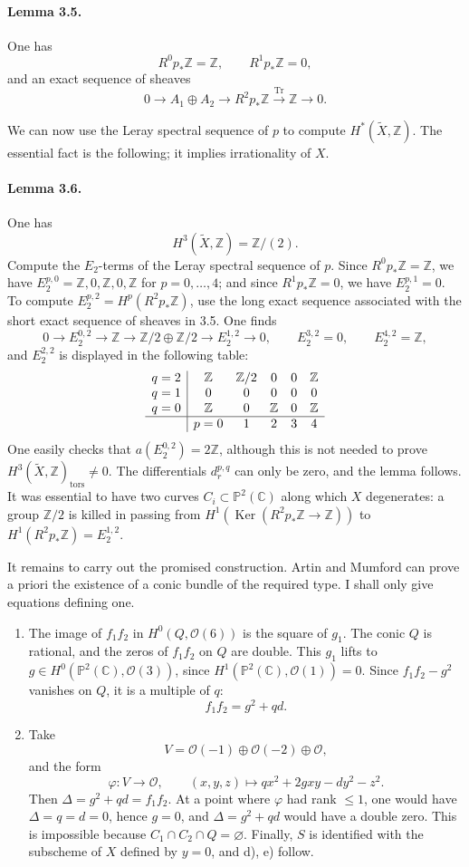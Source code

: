 \documentclass[10pt]{article}
\newcommand{\C}{\mathbb C}
\newcommand{\Pj}{\mathbb P}
\newcommand{\Z}{\mathbb Z}
\newcommand{\Tr}{\operatorname{Tr}}
\newcommand{\Ker}{\operatorname{Ker}}
\newcommand{\tors}{\operatorname{tors}}
\begin{document}
\paragraph{Lemma 3.5.} One has
\[
R^0p_*\Z=\Z,
\qquad R^1p_*\Z=0,
\]
and an exact sequence of sheaves
\[
0\longrightarrow A_1\oplus A_2\longrightarrow R^2p_*\Z\xrightarrow{\Tr}\Z\longrightarrow0.
\]

We can now use the Leray spectral sequence of \(p\) to compute \(H^*(\widetilde X,\Z)\). The essential fact is the following; it implies irrationality of \(X\).

\paragraph{Lemma 3.6.} One has
\[
H^3(\widetilde X,\Z)=\Z/(2).
\]
Compute the \(E_2\)-terms of the Leray spectral sequence of \(p\). Since \(R^0p_*\Z=\Z\), we have \(E_2^{p,0}=\Z,0,\Z,0,\Z\) for \(p=0,\ldots,4\); and since \(R^1p_*\Z=0\), we have \(E_2^{p,1}=0\). To compute \(E_2^{p,2}=H^p(R^2p_*\Z)\), use the long exact sequence associated with the short exact sequence of sheaves in 3.5. One finds
\[
0\to E_2^{0,2}\to\Z\to\Z/2\oplus\Z/2\to E_2^{1,2}\to0,
\qquad E_2^{3,2}=0,
\qquad E_2^{4,2}=\Z,
\]
and \(E_2^{2,2}\) is displayed in the following table:
\[
\begin{array}{c|ccccc}
q=2&\Z&\Z/2&0&0&\Z\\
q=1&0&0&0&0&0\\
q=0&\Z&0&\Z&0&\Z\\ \hline
&p=0&1&2&3&4
\end{array}
\]
One easily checks that \(a(E_2^{0,2})=2\Z\), although this is not needed to prove \(H^3(\widetilde X,\Z)_{\tors}\ne0\). The differentials \(d_r^{p,q}\) can only be zero, and the lemma follows. It was essential to have two curves \(C_i\subset\Pj^2(\C)\) along which \(X\) degenerates: a group \(\Z/2\) is killed in passing from \(H^1(\Ker(R^2p_*\Z\to\Z))\) to \(H^1(R^2p_*\Z)=E_2^{1,2}\).

It remains to carry out the promised construction. Artin and Mumford can prove a priori the existence of a conic bundle of the required type. I shall only give equations defining one.

\begin{enumerate}[label=\arabic*)]
\item The image of \(f_1f_2\) in \(H^0(Q,\mathcal O(6))\) is the square of \(g_1\). The conic \(Q\) is rational, and the zeros of \(f_1f_2\) on \(Q\) are double. This \(g_1\) lifts to \(g\in H^0(\Pj^2(\C),\mathcal O(3))\), since \(H^1(\Pj^2(\C),\mathcal O(1))=0\). Since \(f_1f_2-g^2\) vanishes on \(Q\), it is a multiple of \(q\):
\[
f_1f_2=g^2+qd.
\]
\item Take
\[
V=\mathcal O(-1)\oplus\mathcal O(-2)\oplus\mathcal O,
\]
and the form
\[
\varphi:V\to\mathcal O,
\qquad (x,y,z)
\longmapsto qx^2+2gxy-dy^2-z^2.
\]
Then \(\Delta=g^2+qd=f_1f_2\). At a point where \(\varphi\) had rank \(\le1\), one would have \(\Delta=q=d=0\), hence \(g=0\), and \(\Delta=g^2+qd\) would have a double zero. This is impossible because \(C_1\cap C_2\cap Q=\varnothing\). Finally, \(S\) is identified with the subscheme of \(X\) defined by \(y=0\), and d), e) follow.
\end{enumerate}
\end{document}
